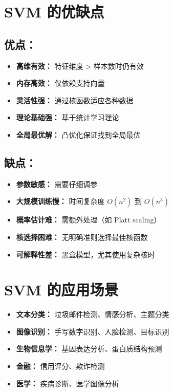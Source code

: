 \documentclass{article}
\begin{document}
\section*{SVM 的优缺点}
\subsection*{优点：}
\begin{itemize}
    \item \textbf{高维有效：} 特征维度 > 样本数时仍有效
    \item \textbf{内存高效：} 仅依赖支持向量
    \item \textbf{灵活性强：} 通过核函数适应各种数据
    \item \textbf{理论基础强：} 基于统计学习理论
    \item \textbf{全局最优解：} 凸优化保证找到全局最优
\end{itemize}

\subsection*{缺点：}
\begin{itemize}
    \item \textbf{参数敏感：} 需要仔细调参
    \item \textbf{大规模训练慢：} 时间复杂度 $O(n^2)$ 到 $O(n^3)$
    \item \textbf{概率估计难：} 需额外处理（如 Platt scaling）
    \item \textbf{核选择困难：} 无明确准则选择最佳核函数
    \item \textbf{可解释性差：} 黑盒模型，尤其使用复杂核时
\end{itemize}

\section*{SVM 的应用场景}
\begin{itemize}
    \item \textbf{文本分类：} 垃圾邮件检测、情感分析、主题分类
    \item \textbf{图像识别：} 手写数字识别、人脸检测、目标识别
    \item \textbf{生物信息学：} 基因表达分析、蛋白质结构预测
    \item \textbf{金融：} 信用评分、欺诈检测
    \item \textbf{医学：} 疾病诊断、医学图像分析
\end{itemize}
\end{document}
